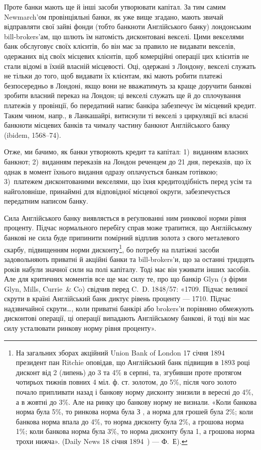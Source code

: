 
Проте банки мають ще й інші засоби утворювати капітал. За тим самим
Newmarch’ом провінціяльні банки, як уже вище згадано, мають звичай відправляти
свої зайві фонди (тобто банкноти Англійського банку) лондонським bill-brokers'ам,
що шлють їм натомість дисконтовані векселі. Цими векселями банк
обслуговує своїх клієнтів, бо він має за правило не видавати векселів, одержаних
від своїх місцевих клієнтів, щоб комерційні операції цих клієнтів не стали відомі
в їхній власній місцевості. Оці, одержані з Лондону, векселі служать не тільки
до того, щоб видавати їх клієнтам, які мають робити платежі безпосередньо
в Лондоні, якщо вони не вважатимуть за краще доручити банкові зробити
власний переказ на Лондон; ці векселі служать ще й до сплочування платежів
у провінції, бо передатний напис банкіра забезпечує їм місцевий кредит. Таким
чином, напр., в Ланкашайрі, витиснули ті векселі з циркуляції всі власні банкноти
місцевих банків та чималу частину банкнот Англійського банку (ibidem,
1568--74).

Отже, ми бачимо, як банки утворюють кредит та капітал: 1)~виданням
власних банкнот; 2)~виданням переказів на Лондон реченцем до 21 дня, переказів,
що їх однак в момент їхнього видання одразу оплачується банкам готівкою;
3)~платежем дисконтованими векселями, що їхня кредитоздібність перед
усім та найголовніше, принаймні для відповідної місцевої округи, забезпечується
передатним написом банку.

Сила Англійського банку виявляється в реґулюванні ним ринкової норми
рівня проценту. Підчас нормального перебігу справ може трапитися, що Англійському
банкові не сила буде припинити помірний відплив золота з свого металевого
скарбу, підвищенням норми дисконту\footnote{
На загальних зборах акційний Union Bank of London 17 січня 1894 президент пан Ritchie
оповідав, що Англійський банк підвищив в 1893 році дисконт від 2 (липень) до 3 та 4\% в серпні,
та, згубивши проте протягом чотирьох тижнів повних 4 міл. ф. ст. золотом, до 5\%, після чого
золото почало припливати назад і банкову норму дисконту знизили в вересні до 4\%, а в жовтні до 3\%.
Але на ринку цю банкову норму не визнали. «Коли банкова норма була 5\%, то ринкова норма була З ,
а норма для грошей була 2\%; коли банкова норма впала до 4\%, то норма дисконту була 2\%, а
грошова норма 1\%; коли банкова норма була 3\%, то норма дисконту була 1, а грошова норма
трохи нижча». (Daily News 18 січня 1894~) — Ф.~Е).
}, бо потребу на платіжні засоби
задовольняють приватні й акційні банки та bill-brokers’и, що за останні тридцять
років набули значної сили на полі капіталу. Тоді має він уживати інших
засобів. Але для критичних моментів все ще має силу те, про що банкір Glyn
(з фірми Glyn, Mills, Currie~\& Co) свідчив перед C.~D. 1848/57: «1709. Підчас
великої скрути в країні Англійський банк диктує рівень проценту — 1710. Підчас
надзвичайної скрути\dots{}, коли приватні банкірі або brokers’и порівняно обмежують
дисконтові операції, ці операції випадають Англійському банкові, й тоді він має
силу усталювати ринкову норму рівня проценту».

